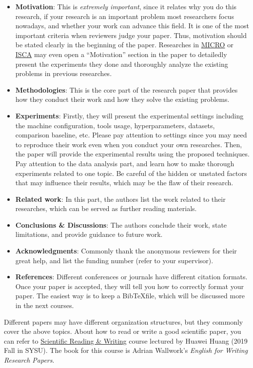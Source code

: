 \documentclass[english]{../TexTemplate/thesis}
\begin{document}
\begin{itemize}
	\item \textbf{Motivation}: This is \emph{extremely important}, since it relates why you do this research, if your research is an important problem most researchers focus nowadays, and whether your work can advance this field. It is one of the most important criteria when reviewers judge your paper. Thus, motivation should be stated clearly in the beginning of the paper. Researches in \href{https://www.microarch.org/}{MICRO} or \href{https://iscaconf.org/}{ISCA} may even open a ``Motivation'' section in the paper to detailedly present the experiments they done and thoroughly analyze the existing problems in previous researches.
	\item \textbf{Methodologies}: This is the core part of the research paper that provides how they conduct their work and how they solve the existing problems.
	\item \textbf{Experiments}: Firstly, they will present the experimental settings including the machine configuration, tools usage, hyperparameters, datasets, comparison baseline, etc. Please pay attention to settings since you may need to reproduce their work even when you conduct your own researches. Then, the paper will provide the experimental results using the proposed techniques. Pay attention to the data analysis part, and learn how to make thorough experiments related to one topic. Be careful of the hidden or unstated factors that may influence their results, which may be the flaw of their research.
	\item \textbf{Related work}: In this part, the authors list the work related to their researches, which can be served as further reading materials.
	\item \textbf{Conclusions \& Discussions}: The authors conclude their work, state limitations, and provide guidance to future work.
	\item \textbf{Acknowledgments}: Commonly thank the anonymous reviewers for their great help, and list the funding number (refer to your supervisor).
	\item \textbf{References}: Different conferences or journals have different citation formats. Once your paper is accepted, they will tell you how to correctly format your paper. The easiest way is to keep a Bib\TeX file, which will be discussed more in the next courses.
\end{itemize}

Different papers may have different organization structures, but they commonly cover the above topics.
About how to read or write a good scientific paper, you can refer to \href{http://inpluslab.com/paperwriting}{Scientific Reading \& Writing} course lectured by Huawei Huang (2019 Fall in SYSU).
The book for this course is Adrian Wallwork's \emph{English for Writing Research Papers}.
\end{document}
